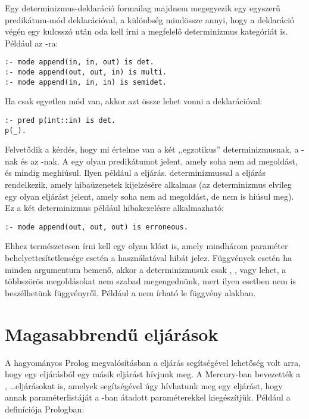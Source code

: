 Egy determinizmus-deklaráció formailag majdnem megegyezik egy egyszerű predikátum-mód
deklarációval, a különbség mindössze annyi, hogy a deklaráció végén egy  kulcsszó
után oda kell írni a megfelelő determinizmus kategóriát is. Például az -ra:

\begin{verbatim}
:- mode append(in, in, out) is det.
:- mode append(out, out, in) is multi.
:- mode append(in, in, in) is semidet.
\end{verbatim}

Ha csak egyetlen mód van, akkor azt össze lehet vonni a  deklarációval:

\begin{verbatim}
:- pred p(int::in) is det.
p(_).
\end{verbatim}

Felvetődik a kérdés, hogy mi értelme van a két ,,egzotikus'' determinizmusnak, a
-nak és az -nak. A  egy olyan predikátumot
jelent, amely soha nem ad megoldást, és mindig meghiúsul. Ilyen például a 
eljárás.  determinizmussal a  eljárás rendelkezik,
amely hibaüzenetek kijelzésére alkalmas (az  determinizmus elvileg egy
olyan eljárást jelent, amely soha nem ad megoldást, de nem is hiúsul meg). Ez a két
determinizmus például hibakezelésre alkalmazható:

\begin{verbatim}
:- mode append(out, out, out) is erroneous.
\end{verbatim}

Ehhez természetesen írni kell egy olyan klózt is, amely mindhárom paraméter
behelyettesítetlensége esetén a  használatával hibát jelez.
\br
Függvények esetén ha minden argumentum bemenő, akkor a determinizmusuk csak
, ,  vagy  lehet, a többszörös
megoldásokat nem szabad megengednünk, mert ilyen esetben nem is beszélhetünk
függvényről. Például a  nem írható le függvény alakban.


\section{Magasabbrendű eljárások}

A hagyományos Prolog megvalósításban a  eljárás segítségével lehetőség
volt arra, hogy egy eljárásból egy másik eljárást hívjunk meg. A Mercury-ban
bevezették a ,  \ldots eljárásokat is, amelyek segítségével
úgy hívhatunk meg egy eljárást, hogy annak paraméterlistáját a -ban
átadott paraméterekkel kiegészítjük. Például a  definíciója Prologban:

